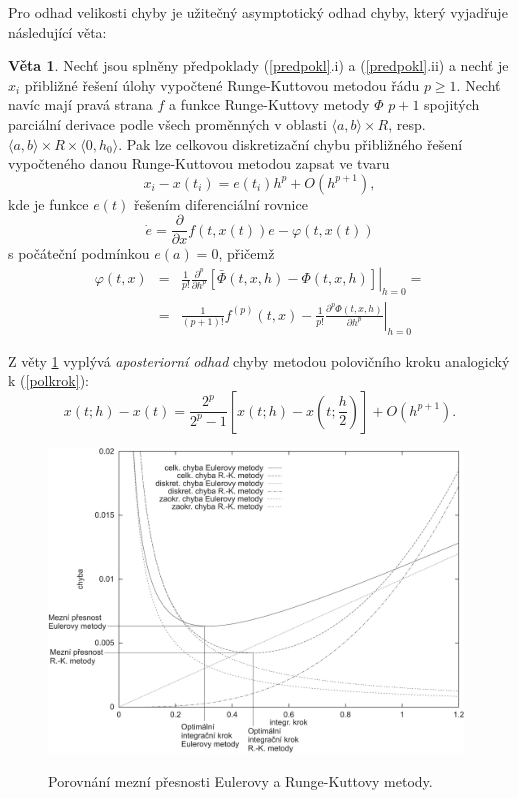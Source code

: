 \documentclass[a4paper, 12pt]{book}
\theoremstyle{definition}
\newtheorem{theorem}{Věta}[section]
\begin{document}
Pro odhad velikosti chyby je užitečný asymptotický odhad chyby, který vyjadřuje
následující věta:
\begin{theorem}\label{Veta3.4}
Nechť jsou splněny předpoklady (\ref{predpokl}.i) a (\ref{predpokl}.ii) a nechť
je $x_i$ přibližné řešení úlohy vypočtené Runge-Kuttovou metodou řádu $p\geq 1$.
Nechť navíc mají pravá strana $f$ a funkce Runge-Kuttovy metody $\Phi$ $p+1$ 
spojitých parciální derivace podle všech proměnných v oblasti 
$\langle a,b\rangle\times R$, resp. 
$\langle a,b\rangle\times R\times\langle 0,h_0\rangle$.
Pak lze celkovou diskretizační chybu přibližného řešení vypočteného danou 
Runge-Kuttovou metodou zapsat ve tvaru
\begin{equation}\label{asympRK}
x_i-x(t_i)=e(t_i)h^p+O(h^{p+1}),
\end{equation}
kde je funkce $e(t)$ řešením diferenciální rovnice
\begin{displaymath}
\dot e=\frac{\partial}{\partial x}f(t,x(t))e-\varphi(t,x(t))
\end{displaymath}
s počáteční podmínkou $e(a)=0$, přičemž
\begin{eqnarray*}
\varphi(t,x)&=&\left.\frac 1{p!}\frac{\partial^p}{\partial h^p}\left[\bar\Phi(t,x,h)-\Phi(t,x,h)\right]\right|_{h=0}=\\
&=&\frac 1{(p+1)!}f^{(p)}(t,x)-\left.\frac 1{p!}\frac{\partial^p\Phi(t,x,h)}{\partial h^p}\right|_{h=0}
\end{eqnarray*}
\end{theorem}

Z věty \ref{Veta3.4} vyplývá {\em aposteriorní odhad} chyby metodou polovičního 
kroku analogický k (\ref{polkrok}):
\begin{equation}\label{polkrokRK}
x(t;h)-x(t)=\frac {2^p}{2^p-1}[x(t;h)-x(t;\frac h2)]+O(h^{p+1}).
\end{equation}

\begin{figure}[ht]
\centering
\includegraphics[width=0.98\textwidth]{chyby3}\\
\caption[]{Porovnání mezní přesnosti Eulerovy a Runge-Kuttovy metody.}
\label{chyby1}
\end{figure}
\end{document}
